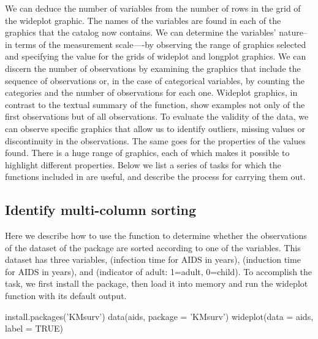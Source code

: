 We can deduce the number of variables from the number of rows in the
grid of the wideplot graphic. The names of the variables are found in
each of the graphics that the catalog now contains. We can determine the
variables' nature--in terms of the measurement scale----by observing the
range of graphics selected and specifying the value 
for the grids of wideplot and longplot graphics. We can discern the
number of observations by examining the graphics that include the
sequence of observations or, in the case of categorical variables, by
counting the categories and the number of observations for each one.
Wideplot graphics, in contrast to the textual summary of the
 function, show examples not only of the first observations
but of all observations. To evaluate the validity of the data, we can
observe specific graphics that allow us to identify outliers, missing
values or discontinuity in the observations. The same goes for the
properties of the values found. There is a huge range of graphics, each
of which makes it possible to highlight different properties. Below we
list a series of tasks for which the functions included in 
are useful, and describe the process for carrying them out.

\hypertarget{identify-multi-column-sorting}{%
	\subsection{Identify multi-column
sorting}\label{identify-multi-column-sorting}}

Here we describe how to use the  function to determine
whether the observations of the dataset  of the package
 are sorted according to one of the variables. This dataset
has three variables,  (infection time for AIDS in years),
 (induction time for AIDS in years), and 
(indicator of adult: 1=adult, 0=child). To accomplish the task, we first
install the package, then load it into memory and run the wideplot
function with its default output.

\begin{example}
  install.packages('KMsurv')
  data(aids, package = 'KMsurv')
  wideplot(data = aids, label = TRUE)
\end{example}


